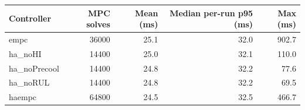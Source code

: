 \begin{tabular}{lrrrr}
\toprule
Controller & MPC solves & Mean (ms) & Median per-run p95 (ms) & Max (ms)\\
\midrule
empc & 36000 & 25.1 & 32.0 & 902.7\\
ha\_noHI & 14400 & 25.0 & 32.1 & 110.0\\
ha\_noPrecool & 14400 & 24.8 & 32.2 & 77.6\\
ha\_noRUL & 14400 & 24.8 & 32.2 & 69.5\\
haempc & 64800 & 24.5 & 32.5 & 466.7\\
\bottomrule
\end{tabular}
